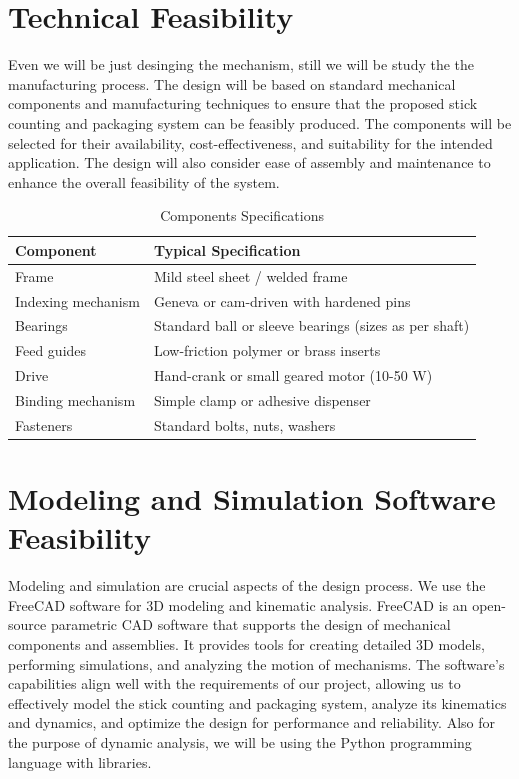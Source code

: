 \section{Technical Feasibility}
Even we will be just desinging the mechanism, still we will be study the the manufacturing process. The design will be based on standard mechanical components and manufacturing techniques to ensure that the proposed stick counting and packaging system can be feasibly produced. The components will be selected for their availability, cost-effectiveness, and suitability for the intended application. The design will also consider ease of assembly and maintenance to enhance the overall feasibility of the system.

\begin{table}[h]
\centering
\caption{Components Specifications}
\begin{tabular}{|l|l|}
\hline
Component & Typical Specification \\
\hline
Frame & Mild steel sheet / welded frame \\
Indexing mechanism & Geneva or cam-driven with hardened pins \\
Bearings & Standard ball or sleeve bearings (sizes as per shaft) \\
Feed guides & Low-friction polymer or brass inserts \\
Drive & Hand-crank or small geared motor (10-50 W) \\
Binding mechanism & Simple clamp or adhesive dispenser \\
Fasteners & Standard bolts, nuts, washers \\
\hline
\end{tabular}
\label{tab:hardware-specs}
\end{table}

\section{Modeling and Simulation Software Feasibility}
Modeling and simulation are crucial aspects of the design process. We use the FreeCAD software for 3D modeling and kinematic analysis. FreeCAD is an open-source parametric CAD software that supports the design of mechanical components and assemblies. It provides tools for creating detailed 3D models, performing simulations, and analyzing the motion of mechanisms. The software's capabilities align well with the requirements of our project, allowing us to effectively model the stick counting and packaging system, analyze its kinematics and dynamics, and optimize the design for performance and reliability. Also for the purpose of dynamic analysis, we will be using the Python programming language with libraries.
\vspace{12px}

